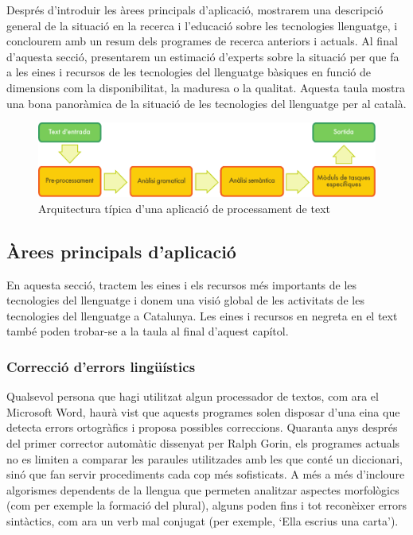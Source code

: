 \begin{multicols}{2}
Després d’introduir les àrees principals d’aplicació, mostrarem una descripció general de la situació en la recerca i l’educació sobre les tecnologies llenguatge, i conclourem amb un resum dels programes de recerca anteriors i actuals. Al final d’aquesta secció, presentarem un estimació d’experts sobre la situació per que fa a les eines i recursos de les tecnologies del llenguatge bàsiques en funció de dimensions com la disponibilitat, la maduresa o la qualitat. Aquesta taula mostra una bona panoràmica de la situació de les tecnologies del llenguatge per al català.  



\begin{figure}[htb]
  \center
  \includegraphics[width=\textwidth]{../_media/catalan/text_processing_app_architecture}
  \caption{Arquitectura típica d'una aplicació de processament de text}
  \label{fig:textprocessingarch_ca}
\end{figure}


\subsection{Àrees principals d’aplicació} 

 En aquesta secció, tractem les eines i els recursos més importants de les tecnologies del llenguatge i 
  donem una visió global de les activitats de les tecnologies del llenguatge a Catalunya. Les eines i recursos en negreta en el text també poden trobar-se a la taula al final d'aquest capítol.

\subsubsection{Correcció d’errors lingüístics}

Qualsevol persona que hagi utilitzat algun processador de textos, com ara el Microsoft Word, haurà vist que aquests programes solen disposar d’una eina que detecta errors ortogràfics i proposa possibles correccions. Quaranta anys després del primer corrector automàtic dissenyat per Ralph Gorin, els programes actuals no es limiten a comparar les paraules utilitzades amb les que conté un diccionari, sinó que fan servir procediments cada cop més sofisticats. A més a més d’incloure algorismes dependents de la llengua que permeten analitzar aspectes morfològics (com per exemple la formació del plural), alguns poden fins i tot reconèixer errors sintàctics, com ara un verb mal conjugat (per exemple, ‘Ella escrius una carta’).


\end{multicols}
